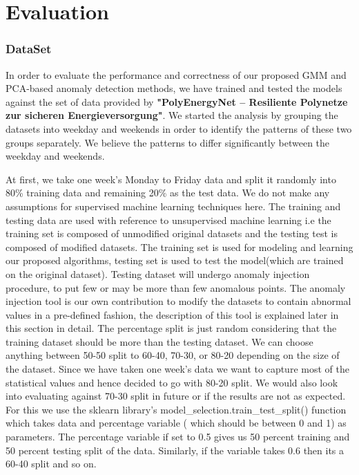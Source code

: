 \chapter{Evaluation}
\subsection*{\textbf{DataSet}} 
In order to evaluate the performance and correctness of our proposed GMM and PCA-based anomaly detection methods, we have trained and tested the models against the set of data provided by \textbf{"PolyEnergyNet – Resiliente Polynetze zur sicheren Energieversorgung"}. We started the analysis by grouping the datasets into weekday and weekends in order to identify the patterns of these two groups separately. We believe the patterns to differ significantly between the weekday and weekends. 

At first, we take one week's Monday to Friday data and split it randomly into 80\% training data and remaining 20\% as the test data. We do not make any assumptions for supervised machine learning techniques here. The training and testing data are used with reference to unsupervised machine learning i.e the training set is composed of unmodified original datasets and the testing test is composed of modified datasets. The training set is used for modeling and learning our proposed algorithms, testing set is used to test the model(which are trained on the original dataset). Testing dataset will undergo anomaly injection procedure, to put few or may be more than few anomalous points. The anomaly injection tool is our own contribution to modify the datasets to contain abnormal values in a pre-defined fashion, the description of this tool is explained later in this section in detail. The percentage split is just random considering that the training dataset should be more than the testing dataset. We can choose anything between 50-50 split to 60-40, 70-30, or 80-20 depending on the size of the dataset. Since we have taken one week's data we want to capture most of the statistical values and hence decided to go with 80-20 split. We would also look into evaluating against 70-30 split in future or if the results are not as expected. For this we use the sklearn library's model\_selection.train\_test\_split() function which takes data and percentage variable ( which should be between 0 and 1) as parameters. The percentage variable if set to 0.5 gives us 50 percent training and 50 percent testing split of the data. Similarly, if the variable takes 0.6 then its a 60-40 split and so on. 

